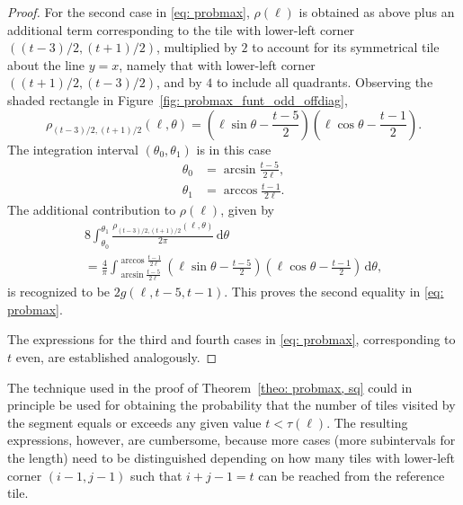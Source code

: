 \documentclass[12pt, a4paper]{article}
\newcommand{\diff}{\,\mathrm d}
\newcommand{\funt}{\tau} %
\newcommand{\probmax}{\rho} %
\newcommand{\len}{\ell} %
\newcommand{\tiles}{t} %
\begin{document}
\begin{proof}
For the second case in \eqref{eq: probmax}, $\probmax(\len)$ is obtained as above plus an additional term corresponding to the tile with lower-left corner $((\tiles-3)/2, (\tiles+1)/2)$, multiplied by $2$ to account for its symmetrical tile about the line $y=x$, namely that with lower-left corner $((\tiles+1)/2, (\tiles-3)/2)$, and by $4$ to include all quadrants. Observing the shaded rectangle in Figure~\ref{fig: probmax_funt_odd_offdiag},
\begin{equation}
\label{eq: probmax: probmax theta odd2}
\probmax_{(\tiles-3)/2, (\tiles+1)/2}(\len, \theta) = \left(\len\sin\theta - \frac{\tiles-5}2\right) \left(\len\cos\theta - \frac{\tiles-1}2\right).
\end{equation}
The integration interval $(\theta_0, \theta_1)$ is in this case
\begin{align}
\theta_0 & = \arcsin\frac{\tiles-5}{2\len}, \\
\theta_1 & = \arccos\frac{\tiles-1}{2\len}.
\end{align}
The additional contribution to $\probmax(\len)$, given by
\begin{multline}
8 \int_{\theta_0}^{\theta_1} \frac{\probmax_{(\tiles-3)/2, (\tiles+1)/2}(\len, \theta)}{2\pi} \diff \theta \\
= \frac 4 \pi \int_{\arcsin\frac{\tiles-5}{2\len}}^{\arccos\frac{\tiles-1}{2\len}} \left( \len\sin\theta - \frac{\tiles-5} 2 \right)  \left( \len\cos\theta - \frac{\tiles-1} 2 \right) \diff \theta,
\end{multline}
is recognized to be $2 g(\len, \tiles-5, \tiles-1)$. This proves the second equality in \eqref{eq: probmax}.

The expressions for the third and fourth cases in \eqref{eq: probmax}, corresponding to $\tiles$ even, are established analogously.
\end{proof}

The technique used in the proof of Theorem~\ref{theo: probmax, sq} could in principle be used for obtaining the probability that the number of tiles visited by the segment equals or exceeds any given value $t < \funt(\len)$. The resulting expressions, however, are cumbersome, because more cases (more subintervals for the length) need to be distinguished depending on how many tiles with lower-left corner $(i-1,j-1)$ such that $i+j-1=t$ can be reached from the reference tile.
\end{document}
